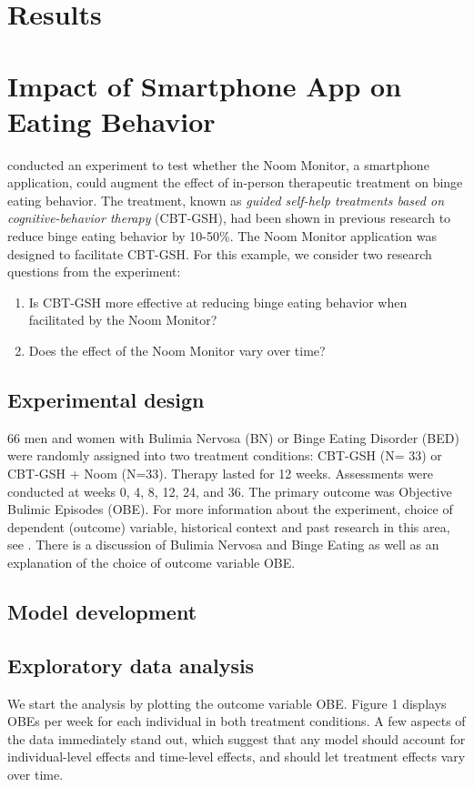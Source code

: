 \documentclass{article}
\begin{document}
\section*{Results}
\section{Impact of Smartphone App on Eating Behavior}
 conducted an experiment to test whether the Noom Monitor, a smartphone application, could augment the effect of in-person therapeutic treatment on binge eating behavior.  The treatment, known as \emph{guided self-help treatments based on cognitive-behavior therapy} (CBT-GSH), had been shown in previous research to reduce binge eating behavior by 10-50\%.  The Noom Monitor application was designed to facilitate CBT-GSH.  For this example, we consider two research questions from the experiment:
\begin{enumerate}
\item{Is CBT-GSH more effective at reducing binge eating behavior when facilitated by the Noom Monitor?}
\item{Does the effect of the Noom Monitor vary over time?}
\end{enumerate}

\subsection{Experimental design}

66 men and women with Bulimia Nervosa (BN) or Binge Eating Disorder (BED) were randomly assigned into two treatment conditions: CBT-GSH (N= 33) or CBT-GSH + Noom (N=33).  Therapy lasted for 12 weeks.  Assessments were conducted at weeks 0, 4, 8, 12, 24, and 36.  The primary outcome was Objective Bulimic Episodes (OBE).  For more information about the experiment, choice of dependent (outcome) variable, historical context and past research in this area, see . There is a discussion of Bulimia Nervosa and Binge Eating as well as an explanation of the choice of outcome variable OBE.

\subsection{Model development}
\subsection*{Exploratory data analysis}
We start the analysis by plotting the outcome variable OBE. Figure 1 displays OBEs per week for each individual in both treatment conditions.  A few aspects of the data immediately stand out, which suggest that any model should account for individual-level effects and time-level effects, and should let treatment effects vary over time.  
\end{document}
